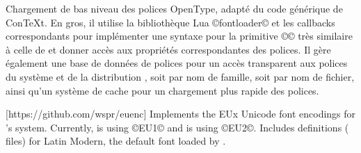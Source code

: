 \documentclass{lltxdoc}
\begin{document}
Chargement de bas niveau des polices OpenType, adapté du code générique de ConTeXt. En gros, il utilise la bibliothèque Lua ©fontloader© et les callbacks correspondants pour implémenter une syntaxe pour la primitive ©\font© très similaire à celle de \xetex et donner accès aux propriétés correspondantes des polices. Il gère également une base de données de polices pour un accès transparent aux polices du système et de la distribution \tex, soit par nom de famille, soit par nom de fichier, ainsi qu'un système de cache pour un chargement plus rapide des polices.

[https://github.com/wspr/euenc]
Implements the EUx Unicode font encodings for \latex's  system.
Currently, \xelatex is using ©EU1© and \lualatex is using ©EU2©. Includes
definitions ( files) for Latin Modern, the default font loaded by
.
\end{document}
